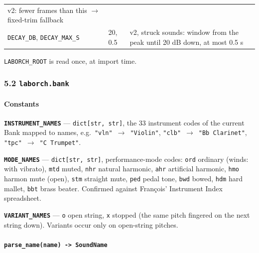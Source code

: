 \documentclass[
  10pt,
]{article}
\begin{document}
\begin{longtable}[]{@{}lll@{}}
\begin{minipage}[t]{0.30\columnwidth}
v2: fewer frames than this $\rightarrow$ fixed-trim fallback\strut
\end{minipage}\tabularnewline
\begin{minipage}[t]{0.30\columnwidth}\raggedright
\texttt{DECAY\_DB}, \texttt{DECAY\_MAX\_S}\strut
\end{minipage} &
\begin{minipage}[t]{0.30\columnwidth}\raggedright
20, 0.5\strut
\end{minipage} &
\begin{minipage}[t]{0.30\columnwidth}\raggedright
v2, struck sounds: window from the peak until 20 dB down, at
most 0.5 s\strut
\end{minipage}\tabularnewline
\bottomrule
\end{longtable}

\texttt{LABORCH\_ROOT} is read once, at import time.

\subsubsection{\texorpdfstring{5.2
\texttt{laborch.bank}}{5.2 laborch.bank}}

\paragraph{Constants}

\textbf{\texttt{INSTRUMENT\_NAMES}} ---
\texttt{dict{[}str,\ str{]}}, the 33 instrument codes of the
current Bank mapped to names,
e.g.~\texttt{"vln"}~$\rightarrow$~\texttt{"Violin"},
\texttt{"clb"}~$\rightarrow$~\texttt{"Bb\ Clarinet"},
\texttt{"tpc"}~$\rightarrow$~\texttt{"C\ Trumpet"}.

\textbf{\texttt{MODE\_NAMES}} ---
\texttt{dict{[}str,\ str{]}}, performance-mode codes:
\texttt{ord} ordinary (winds: with vibrato), \texttt{mtd}
muted, \texttt{nhr} natural harmonic, \texttt{ahr}
artificial harmonic, \texttt{hmo} harmon mute (open),
\texttt{stm} straight mute, \texttt{ped} pedal tone,
\texttt{bwd} bowed, \texttt{hdm} hard mallet, \texttt{bbt}
brass beater. Confirmed against François' Instrument Index
spreadsheet.

\textbf{\texttt{VARIANT\_NAMES}} --- \texttt{o} open string,
\texttt{x} stopped (the same pitch fingered on the next
string down). Variants occur only on open-string pitches.

\paragraph{\texorpdfstring{\texttt{parse\_name(name)\ -\textgreater{}\ SoundName}}{parse\_name(name) -\textgreater{} SoundName}}
\end{document}
